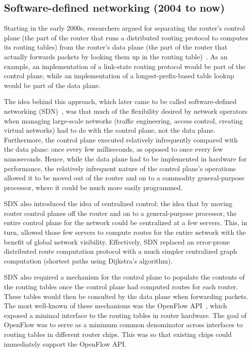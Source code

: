 
\subsection{Software-defined networking (2004 to now)}
Starting in the early 2000s, researchers argued for separating the router's
control plane (the part of the router that runs a distributed routing
protocol to computes its routing tables) from the router's data plane (the
part of the router that actually forwards packets by looking them up in the
routing table)~\cite{route_control, case_for, forces, fourd, ethane}. As an
example, an implementation of a link-state routing protocol would be part of
the control plane, while an implementation of a longest-prefix-based table
lookup would be part of the data plane.

The idea behind this approach, which later came to be called software-defined
networking (SDN)~\cite{sdn_coining}, was that much of the flexibility desired
by network operators when managing large-scale networks (\eg traffic
engineering, access control, creating virtual networks) had to do with the
control plane, not the data plane.  Furthermore, the control plane executed
relatively infrequently compared with the data plane: once every few
milliseconds, as opposed to once every few nanoseconds. Hence, while the data
plane had to be implemented in hardware for performance, the relatively
infrequent nature of the control plane's operations allowed it to be moved out
of the router and on to a commodity general-purpose processor, where it could
be much more easily programmed.

SDN also introduced the idea of centralized control: the idea that by moving
router control planes off the router and on to a general-purpose processor, the
entire control plane for the network could be centralized at a few servers.
This, in turn, allowed those few servers to compute routes for the entire
network with the benefit of global network visibility. Effectively, SDN
replaced an error-prone distributed route computation protocol with a much
simpler centralized graph computation (\eg shortest paths using Dijkstra's
algorithm).

SDN also required a mechanism for the control plane to populate the contents of
the routing tables once the control plane had computed routes for each router.
These tables would then be consulted by the data plane when forwarding packets.
The most well-known of these mechanisms was the OpenFlow API~\cite{openflow},
which exposed a minimal interface to the routing tables in router hardware.
The goal of OpenFlow was to serve as a minimum common denominator across
interfaces to routing tables in different router chips. This was so that
existing chips could immediately support the OpenFlow API.

